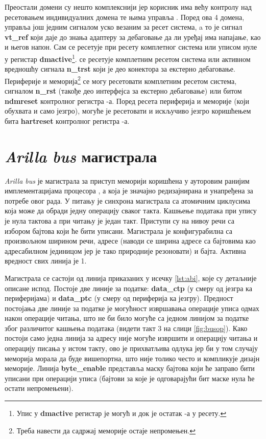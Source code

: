 Преостали домени су нешто комплекснији јер корисник има већу контролу над ресетовањем индивидуалних домена те њима управља . Поред ова 4 домена,  управља још једним сигналом уско везаним за ресет система, a то је сигнал \textbf{vt\_ref} који даје до знања адаптеру за дебаговање да ли уређај има напајање, као и његов напон.
Сам  се ресетује при ресету комплетног система или уписом нуле у регистар \textbf{dmactive}\footnote{Упис у \textbf{dmactive} регистар је могућ и док је остатак -а у ресету.}.
 се ресетује комплетним ресетом система или активном вредношћу сигнала \textbf{n\_trst} који је део конектора за екстерно дебаговање.
Периферије и меморија\footnote{Треба навести да садржај меморије остаје непромењен.} се могу ресетовати комплетним ресетом система, сигналом \textbf{n\_rst} (такође део интерфејса за екстерно дебаговање) или битом \textbf{ndmreset} контролног регистра -а.
Поред ресета периферија и меморије (који обухвата и само језгро), могуће је ресетовати и искључиво језгро коришћењем бита \textbf{hartreset} контролног регистра -а.

\section{\textit{Arilla bus} магистрала}

\textit{Arilla bus} је магистрала за приступ меморији коришћена у ауторовим ранијим имплементацијама  процесора \cite{arilla}, а која је значајно редизајнирана и унапређена за потребе овог рада. У питању је синхрона магистрала са атомичним циклусима која може да обради једну операцију сваког такта. Кашњење података при упису је нула тактова а при читању је један такт. Приступи су на нивоу речи са избором бајтова који ће бити уписани.
Магистрала је конфигурабилна са произвољном ширином речи, адресе (наводи се ширина адресе са бајтовима као адресабилном јединицом јер је тако природније резоновати) и бајта. Активна вредност свих линија је 1.



Магистрала се састоји од линија приказаних у исечку \ref{lst:abi}, које су детаљније описане испод.
Постоје две линије за податке: \textbf{data\_ctp} (у смеру од језгра ка периферијама) и \textbf{data\_ptc} (у смеру од периферија ка језгру). Предност постојања две линије за податке је могућност извршавања операције уписа одмах након операције читања, што не би било могуће са једном линијом за податке због различитог кашњења података (видети такт 3 на слици  \ref{fig:busop}). Како постоји само једна линија за адресу није могуће извршити и операцију читања и операцију писања у истом такту, ово је прихватљива одлука јер би у том случају меморија морала да буде вишепортна, што није толико често и компликује дизајн меморије. Линија \textbf{byte\_enable} представља маску бајтова који ће заправо бити уписани при операцији уписа (бајтови за које је одговарајући бит маске нула ће остати непромењени).

